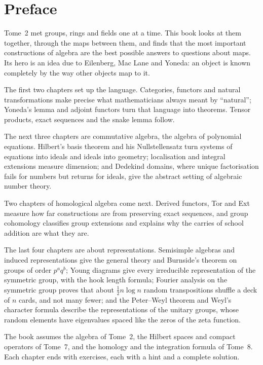 \chapter*{Preface}
Tome~2 met groups, rings and fields one at a time. This book looks at them together, through the maps between them, and finds that
the most important constructions of algebra are the best possible answers to questions about maps. Its hero is an idea due to
Eilenberg, Mac Lane and Yoneda: an object is known completely by the way other objects map to it.

The first two chapters set up the language. Categories, functors and natural transformations make precise what mathematicians always
meant by ``natural''; Yoneda's lemma and adjoint functors turn that language into theorems. Tensor products, exact sequences and
the snake lemma follow.

The next three chapters are commutative algebra, the algebra of polynomial equations. Hilbert's basis theorem and his
Nullstellensatz turn systems of equations into ideals and ideals into geometry; localisation and integral extensions measure
dimension; and Dedekind domains, where unique factorisation fails for numbers but returns for ideals, give the abstract setting of
algebraic number theory.

Two chapters of homological algebra come next. Derived functors, Tor and Ext measure how far constructions are from preserving exact
sequences, and group cohomology classifies group extensions and explains why the carries of school addition are what they are.

The last four chapters are about representations. Semisimple algebras and induced representations give the general theory and
Burnside's theorem on groups of order $p^aq^b$; Young diagrams give every irreducible representation of the symmetric group, with the
hook length formula; Fourier analysis on the symmetric group proves that about $\frac12n\log n$ random transpositions shuffle a deck
of $n$ cards, and not many fewer; and the Peter--Weyl theorem and Weyl's character formula describe the representations of the
unitary groups, whose random elements have eigenvalues spaced like the zeros of the zeta function.

The book assumes the algebra of Tome~2, the Hilbert spaces and compact operators of Tome~7, and the homology and the integration
formula of Tome~8. Each chapter ends with exercises, each with a hint and a complete solution.
